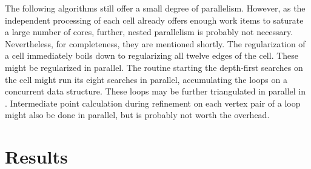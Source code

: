 The following algorithms still offer a small degree of parallelism.
However, as the independent processing of each cell already offers enough work items to saturate a large number of cores, further, nested parallelism is probably not necessary.
Nevertheless, for completeness, they are mentioned shortly.
The regularization of a cell immediately boils down to regularizing all twelve edges of the cell.
These might be regularized in parallel.
The  routine starting the depth-first searches on the cell might run its eight searches in parallel, accumulating the loops on a concurrent data structure.
These loops may be further triangulated in parallel in .
Intermediate point calculation during refinement on each vertex pair of a loop might also be done in parallel, but is probably not worth the overhead.


\section{Results}
\label{sec:tri_dexel_results}

